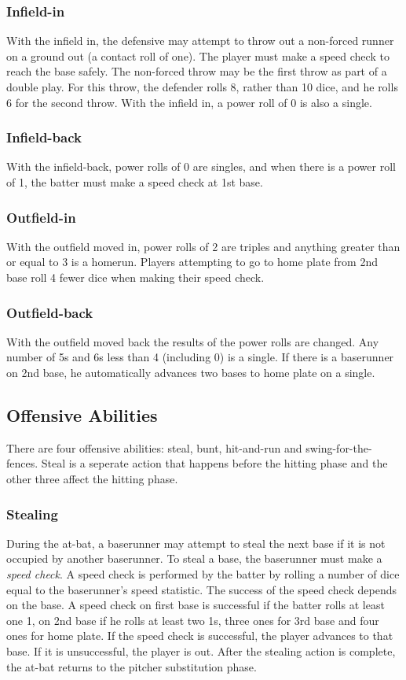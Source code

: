\documentclass[12pt]{article} %
\begin{document}
\subsubsection{Infield-in}
With the infield in, the defensive may attempt to throw out a non-forced runner on a ground out (a contact roll of one).  The player must make a speed check to reach the base safely. The non-forced throw may be the first throw as part of a double play.  For this throw, the defender rolls 8, rather than 10 dice, and he rolls 6 for the second throw.  With the infield in, a power roll of 0 is also a single.

\subsubsection{Infield-back}
With the infield-back, power rolls of 0 are singles, and when there is a power roll of 1, the batter must make a speed check at 1st base.  

\subsubsection{Outfield-in}
With the outfield moved in, power rolls of 2 are triples and anything greater than or equal to 3 is a homerun.  Players attempting to go to home plate from 2nd base roll 4 fewer dice when making their speed check.

\subsubsection{Outfield-back}
With the outfield moved back the results of the power rolls are changed.  Any number of 5s and 6s less than 4 (including 0) is a single.  If there is a baserunner on 2nd base, he automatically advances two bases to home plate on a single.

\subsection{Offensive Abilities}
There are four offensive abilities: steal, bunt, hit-and-run and swing-for-the-fences.  Steal is a seperate action that happens before the hitting phase and the other three affect the hitting phase.

\subsubsection{Stealing}
During the at-bat, a baserunner may attempt to steal the next base if it is not occupied by another baserunner.  To steal a base, the baserunner must make a \emph{speed check}.  A speed check is performed by the batter by rolling a number of dice equal to the baserunner's speed statistic.  The success of the speed check depends on the base.  A speed check on first base is successful if the batter rolls at least one 1, on 2nd base if he rolls at least two 1s, three ones for 3rd base and four ones for home plate.  If the speed check is successful, the player advances to that base.  If it is unsuccessful, the player is out.  After the stealing action is complete, the at-bat returns to the pitcher substitution phase.  
\end{document}
